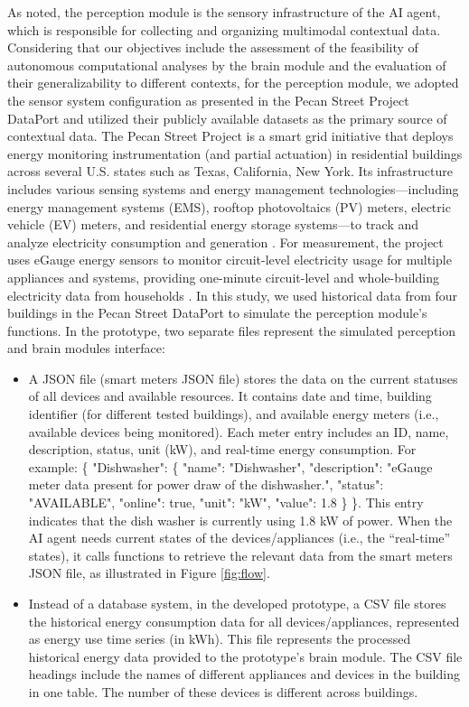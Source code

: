 \documentclass[final,3p,times]{elsarticle}
\begin{document}
As noted, the perception module is the sensory infrastructure of the AI agent, which is responsible for collecting and organizing multimodal contextual data. Considering that our objectives include the assessment of the feasibility of autonomous computational analyses by the brain module and the evaluation of their generalizability to different contexts, for the perception module, we adopted the sensor system configuration as presented in the Pecan Street Project DataPort \cite{pecanstreet} and utilized their publicly available datasets as the primary source of contextual data. The Pecan Street Project is a smart grid initiative that deploys energy monitoring instrumentation (and partial actuation) in residential buildings across several U.S. states such as Texas, California, New York. Its infrastructure includes various sensing systems and energy management technologies---including energy management systems (EMS), rooftop photovoltaics (PV) meters, electric vehicle (EV) meters, and residential energy storage systems---to track and analyze electricity consumption and generation \cite{pecanstreet}. For measurement, the project uses eGauge energy sensors to monitor circuit-level electricity usage for multiple appliances and systems, providing one-minute circuit-level and whole-building electricity data from households \cite{pecanstreet, parson2015dataport}. In this study, we used historical data from four buildings in the Pecan Street DataPort to simulate the perception module’s functions. In the prototype, two separate files represent the simulated perception and brain modules interface:

\begin{itemize}
\item A JSON file (smart meters JSON file) stores the data on the current statuses of all devices and available resources. It contains date and time, building identifier (for different tested buildings), and available energy meters (i.e., available devices being monitored). Each meter entry includes an ID, name, description, status, unit (kW), and real-time energy consumption. For example: \{
  "Dishwasher": \{
    "name": "Dishwasher",
    "description": "eGauge meter data present for power draw of the dishwasher.",
    "status": "AVAILABLE",
    "online": true,
    "unit": "kW",
    "value": 1.8
  \}
\}.
This entry indicates that the dish washer is currently using 1.8 kW of power. When the AI agent needs current states of the devices/appliances (i.e., the “real-time” states), it calls functions to retrieve the relevant data from the smart meters JSON file, as illustrated in Figure \ref{fig:flow}.

\item Instead of a database system, in the developed prototype, a CSV file stores the historical energy consumption data for all devices/appliances, represented as energy use time series (in kWh). This file represents the processed historical energy data provided to the prototype's brain module. The CSV file headings include the names of different appliances and devices in the building in one table. The number of these devices is different across buildings.
\end{itemize}
\end{document}
